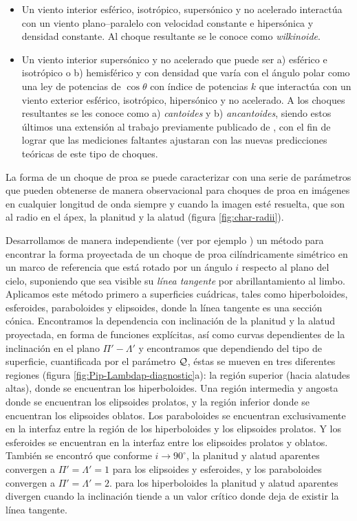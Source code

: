 \begin{itemize}
\item Un viento interior esférico, isotrópico, supersónico y no acelerado interactúa con un viento plano--paralelo con velocidad constante e hipersónica y densidad constante. Al choque resultante se le conoce como \textit{wilkinoide}.
  \item Un viento interior supersónico y no acelerado que puede ser a) esférico e isotrópico o b) hemisférico y con densidad que varía con el ángulo polar como una ley de potencias de $\cos\theta$ con índice de potencias $k$ que interactúa con un viento exterior esférico, isotrópico, hipersónico y no acelerado. A los choques resultantes se les conoce como a) \textit{cantoides} y b) \textit{ancantoides}, siendo estos últimos una extensión al trabajo previamente publicado de \citet{Canto:1996}, con el fin de lograr que las mediciones faltantes ajustaran con las nuevas predicciones teóricas de este tipo de choques.
\end{itemize}

La forma de un choque de proa se puede caracterizar con una serie de parámetros que pueden obtenerse de manera observacional para choques de proa en imágenes en cualquier longitud de onda siempre y cuando la imagen esté resuelta, que son al radio en el ápex, la planitud y la alatud (figura \ref{fig:char-radii}). 

Desarrollamos de manera independiente (ver por ejemplo \citet{Wilkin-thesis}) un método para encontrar la forma proyectada de un choque de proa cilíndricamente simétrico en un marco de referencia que está rotado por un ángulo $i$ respecto al plano del cielo, suponiendo que sea visible su \textit{línea tangente} por abrillantamiento al limbo. Aplicamos este método primero a superficies cuádricas, tales como hiperboloides, esferoides, paraboloides y elipsoides, donde la línea tangente es una sección cónica. Encontramos la dependencia con inclinación de la planitud y la alatud proyectada, en forma de funciones explícitas, así como curvas dependientes de la inclinación en el plano $\Pi'-\Lambda'$ y encontramos que dependiendo del tipo de superficie, cuantificada por el parámetro $\mathcal{Q}{}$, éstas se mueven en tres diferentes regiones (figura \ref{fig:Pip-Lambdap-diagnostic}a): la región superior (hacia alatudes altas), donde se encuentran los hiperboloides. Una región intermedia y angosta donde se encuentran los elipsoides prolatos, y la región inferior donde se encuentran los elipsoides oblatos. Los paraboloides se encuentran exclusivamente en la interfaz entre la región de los hiperboloides y los elipsoides prolatos. Y los esferoides se encuentran en la interfaz entre los elipsoides prolatos y oblatos. También se encontró que conforme $i\to 90^\circ$, la planitud y alatud aparentes convergen a $\Pi'=\Lambda'=1$ para los elipsoides y esferoides, y los paraboloides convergen a $\Pi'=\Lambda'=2$. para los hiperboloides la planitud y alatud aparentes divergen cuando la inclinación tiende a un valor crítico donde deja de existir la línea tangente.


